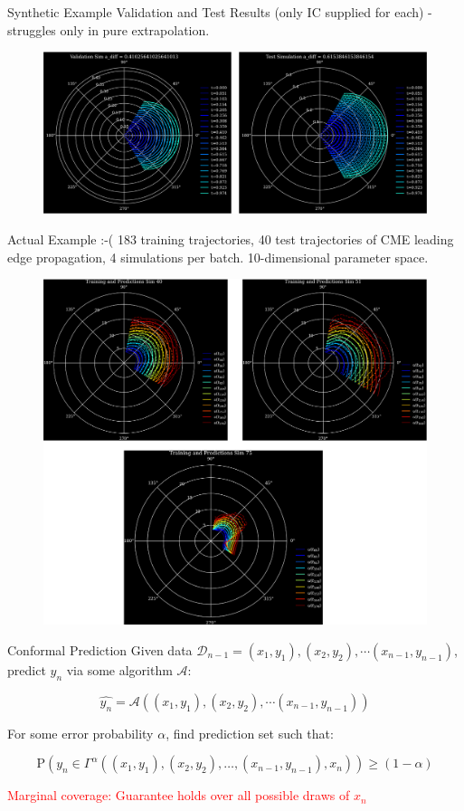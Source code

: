 \documentclass[usenames,dvipsnames]{beamer}
\theoremstyle{definition}
\let\oldcite=\cite
\renewcommand{\cite}[2][]{\textcolor{green}{\oldcite[#1]{#2}}}
\begin{document}
\begin{frame}{Synthetic Example}
Validation and Test Results (only IC supplied for each) - struggles only in pure extrapolation.
\begin{figure}
    \centering
    \includegraphics[width=\linewidth]{cardioid_curves3.png}
    \label{fig:cc3}
\end{figure}

\end{frame}

\begin{frame}{Actual Example :-(}
183 training trajectories, 40 test trajectories of CME leading edge propagation, 4 simulations per batch. 10-dimensional parameter space.

\begin{figure}
    \centering
    \includegraphics[width=0.6\linewidth]{CME_test_samples.png}
    \label{fig:cc4}
\end{figure}
\end{frame}

\begin{frame}{Conformal Prediction}
    \cite{shafer08} Given data $\mathcal{D}_{n - 1} = {(x_1, y_1), (x_2, y_2), \cdots (x_{n-1}, y_{n-1})}$, predict $y_n$ via some algorithm $\mathcal{A}$:

    $$\hat{y_n} = \mathcal{A}((x_1, y_1), (x_2, y_2), \cdots (x_{n-1}, y_{n-1}))$$

    \pause

    For some error probability $\alpha$, find prediction set such that:

    $$\mathrm{P}\left(y_{n}\in\Gamma^{\alpha}((x_{1}, y_1),(x_{2}, y_2),\ldots,(x_{n-1}, y_{n-1}), x_n)\right)\geq(1-\alpha)$$

    \textcolor{red}{Marginal coverage: Guarantee holds over all possible draws of $x_{n}$}

\end{frame}
\end{document}

